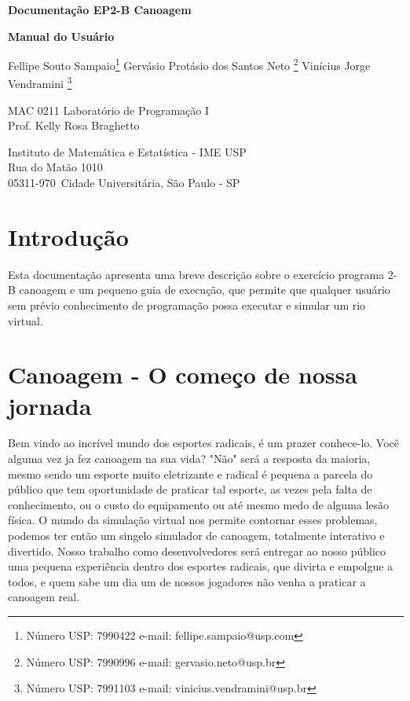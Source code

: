 \documentclass[a4paper,11pt]{article}
\begin{document}
\begin{center}{\Large \bf Documenta\c{c}ão EP2-B Canoagem \\ }\end{center}
\begin{center}{\Large \bf Manual do Usuário\\ }\end{center}

\begin{center}
{
Fellipe Souto Sampaio\footnote{Número USP: 7990422 e-mail: fellipe.sampaio@usp.com}
Gervásio Protásio dos Santos Neto \footnote{Número USP: 7990996 e-mail: gervasio.neto@usp.br}
Vinícius Jorge Vendramini \footnote{Número USP: 7991103 e-mail: vinicius.vendramini@usp.br}
}

\end{center}

\begin{center}
MAC 0211 Laboratório de Programa\c{c}ão I \\
Prof. Kelly Rosa Braghetto \\
             
\end{center}

\begin{center}
Instituto de Matemática e Estatística - IME USP \\
 Rua do Matão 1010 \\
 05311-970\, Cidade Universitária, São Paulo - SP \\
\end{center}

\newpage

\section{Introdu\c{c}ão}
Esta documenta\c{c}ão apresenta uma breve descri\c{c}ão sobre o exercício programa 2-B canoagem e um pequeno guia de execu\c{c}ão, que permite que qualquer usuário sem prévio conhecimento de programa\c{c}ão possa executar e simular um rio virtual.

\section{Canoagem - O come\c{c}o de nossa jornada}
Bem vindo ao incrível mundo dos esportes radicais, é um prazer conhece-lo. Você alguma vez ja fez canoagem na sua vida? "Não" será a resposta da maioria, mesmo sendo um esporte muito eletrizante e radical é pequena a parcela do público que tem oportunidade de praticar tal esporte, as vezes pela falta de conhecimento, ou o custo do equipamento ou até mesmo medo de alguma lesão física.
O mundo da simula\c{c}ão virtual nos permite contornar esses problemas, podemos ter então um singelo simulador de canoagem, totalmente interativo e divertido. Nosso trabalho como desenvolvedores será entregar ao nosso público uma pequena experiência dentro dos esportes radicais, que divirta e empolgue a todos, e quem sabe um dia um de nossos jogadores não venha a praticar a canoagem real.
\end{document}
